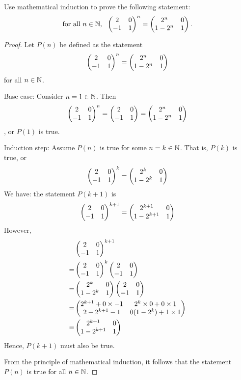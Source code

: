 \begin{question}
	\normalfont
	
	Use mathematical induction to prove the following statement:
	\begin{align*}
		\textnormal{for all}\ n\in\Natural,\ \ 
		\MatTwoTwo{2}{0}{-1}{1}^n
		= \MatTwoTwo{2^n}{0}{1-2^n}{1}.
	\end{align*}
\end{question}

\begin{proof}
    \renewcommand{\qedsymbol}{$\blacksquare$}
    Let $P(n)$ be defined as the statement 
    \[
        \begin{aligned}
            \begin{pmatrix} 2 &0\\ -1 &1 \end{pmatrix}^n=\begin{pmatrix} 2^n &0\\ 1-2^n &1 \end{pmatrix}
        \end{aligned}
    \]
    for all $n\in\mathbb N$. 

    Base case: Consider $n=1\in\mathbb N$. Then 
    \[
        \begin{aligned}
            \begin{pmatrix} 2 &0\\ -1 &1 \end{pmatrix}^n=\begin{pmatrix} 2 &0\\ -1 &1 \end{pmatrix}=\begin{pmatrix} 2^n &0\\ 1-2^n &1 \end{pmatrix}
        \end{aligned}
    \]
    , or $P(1)$ is true.

    Induction step: Assume $P(n)$ is true for some $n=k\in\mathbb N$. That is, $P(k)$ is true, or 
    \[
        \begin{aligned}
            \begin{pmatrix} 2 &0\\ -1 &1 \end{pmatrix}^k=\begin{pmatrix} 2^k &0\\ 1-2^k &1 \end{pmatrix}
        \end{aligned}
    \] 
    We have: the statement $P(k+1)$ is 
    \[
        \begin{aligned}
            \begin{pmatrix} 2 &0\\ -1 &1 \end{pmatrix}^{k+1}=\begin{pmatrix} 2^{k+1} &0\\ 1-2^{k+1} &1 \end{pmatrix}
        \end{aligned}
    \]
    However,
    \[
        \begin{aligned}
            &\begin{pmatrix} 2 &0\\ -1 &1 \end{pmatrix}^{k+1}\\
            =&\begin{pmatrix} 2 &0\\ -1 &1 \end{pmatrix}^k\begin{pmatrix} 2 &0\\ -1 &1 \end{pmatrix}\\
            =&\begin{pmatrix} 2^k &0\\ 1-2^k &1 \end{pmatrix}\begin{pmatrix} 2 &0\\ -1 &1 \end{pmatrix}\\
            =&\begin{pmatrix} 2^{k+1}+0\times-1 &2^k\times 0+0\times 1\\ 2-2^{k+1}-1 &0(1-2^k)+1\times 1 \end{pmatrix}\\
            =&\begin{pmatrix} 2^{k+1} &0\\ 1-2^{k+1} &1 \end{pmatrix}
        \end{aligned}
    \]
    Hence, $P(k+1)$ must also be true.

    From the principle of mathematical induction, it follows that the statement $P(n)$ is true for all $n\in\mathbb N$.
\end{proof}
